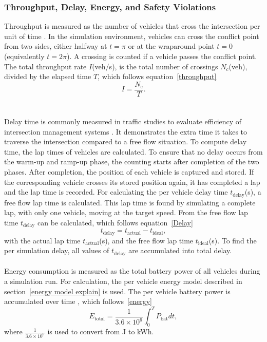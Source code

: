 \subsubsection{Throughput, Delay, Energy, and Safety Violations}
Throughput is measured as the number of vehicles that cross the intersection per unit of time \parencite{soltani2025communication}. In the simulation environment, vehicles can cross the conflict point from two sides, either halfway at \(t=\pi\) or at the wraparound point \(t = 0 \) (equivalently \(t=2\pi\)). A crossing is counted if a vehicle passes the conflict point. The total throughput rate \(I\)(veh/s), is the total number of crossings \(N_c\)(veh), divided by the elapsed time \(T\), which follows equation~\ref{throughput}
\begin{equation}
\label{throughput}
I = \frac{N_\text{c}}{T}.   
\end{equation}  
\\\\
Delay time is commonly measured in traffic studies to evaluate efficiency of intersection management systems \parencite{soltani2025communication}. It demonstrates the extra time it takes to traverse the intersection compared to a free flow situation. To compute delay time, the lap times of vehicles are calculated. To ensure that no delay occurs from the warm-up and ramp-up phase, the counting starts after completion of the two phases. After completion, the position of each vehicle is captured and stored. If the corresponding vehicle crosses its stored position again, it has completed a lap and the lap time is recorded. 
For calculating the per vehicle delay time \(t_\text{delay}\)(s), a free flow lap time is calculated. This lap time is found by simulating a complete lap, with only one vehicle, moving at the target speed. From the free flow lap time  \(t_\text{delay}\) can be calculated, which follows equation~\ref{Delay}
\begin{equation}
\label{Delay}
    t_\text{delay} = t_\text{actual}-t_\text{ideal},
\end{equation}
with the actual lap time \(t_\text{actual}\)(s), and the free flow lap time \(t_\text{ideal}\)(s). To find the per simulation delay, all values of \(t_\text{delay}\) are accumulated into total delay.
\\\\
Energy consumption is measured as the total battery power of all vehicles during a simulation run. For calculation, the per vehicle energy model described in section~\ref{energy model explain} is used. The per vehicle battery power is accumulated over time \parencite{chen2021review}, which follows~\ref{energy} \begin{equation}
\label{energy}
    E_\text{total} = \frac{1}{3.6\times10^6}\int_0^T P_\text{bat}dt, 
\end{equation} where \(\frac{1}{3.6\times10^6}\) is used to convert from J to kWh.
